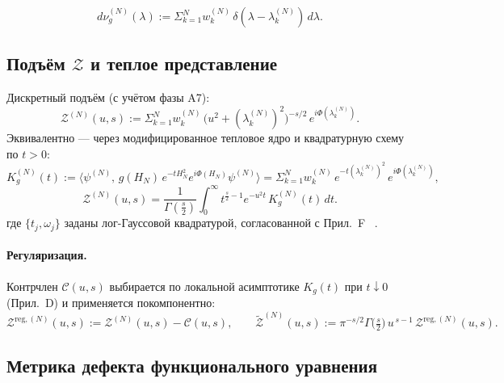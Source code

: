 \documentclass{article}
\numberwithin{equation}{section}
\theoremstyle{plain}
\theoremstyle{definition}
\theoremstyle{remark}
\def\delta{δ}\def\Delta{Δ}\def\epsilon{ε}\def\zeta{ζ}%
\def\omega{ω}\def\Omega{Ω}\def\hbar{ℏ}\def\nabla{∇}%
\def\infty{∞}\def\partial{∂}\def\sum{Σ}\def\int{∫}%
\begin{document}
\begin{equation}\label{eq:H-nuN}
  d\nu_g^{(N)}(\lambda):=\sum_{k=1}^N w_k^{(N)}\,\delta(\lambda-\lambda_k^{(N)})\,d\lambda.
\end{equation}

\subsection*{Подъём \(\mathcal Z\) и теплое представление}

Дискретный подъём (с учётом фазы A7):
\begin{equation}\label{eq:H-ZN}
  \mathcal Z^{(N)}(u,s):=\sum_{k=1}^N w_k^{(N)}\,\big(u^2+(\lambda_k^{(N)})^2\big)^{-s/2}\,e^{i\Phi(\lambda_k^{(N)})}.
\end{equation}
Эквивалентно — через модифицированное тепловое ядро и квадратурную схему по \(t>0\):
\begin{equation}\label{eq:H-heatN}
  K_g^{(N)}(t):=\big\langle \psi^{(N)},\,g(H_N)\,e^{-t H_N^2}e^{i\Phi(H_N)}\psi^{(N)}\big\rangle
  = \sum_{k=1}^N w_k^{(N)}\,e^{-t(\lambda_k^{(N)})^2}\,e^{i\Phi(\lambda_k^{(N)})},
\end{equation}
\begin{equation}\label{eq:H-ZN-heat}
  \mathcal Z^{(N)}(u,s)=\frac{1}{\Gamma(\frac{s}{2})}\int_0^\infty t^{\frac{s}{2}-1}e^{-u^2 t}\,K_g^{(N)}(t)\,dt.
\end{equation}
где \(\{t_j,\omega_j\}\) заданы лог-Гауссовой квадратурой, согласованной с Прил.~F ~\cite{DavisRabinowitz1984}.

\paragraph{Регуляризация.}
Контрчлен \(\mathcal C(u,s)\) выбирается по локальной асимптотике \(K_g(t)\) при \(t\downarrow 0\) (Прил.~D) и применяется покомпонентно:
\begin{equation}\label{eq:H-reg}
  \mathcal Z^{\mathrm{reg},(N)}(u,s):=\mathcal Z^{(N)}(u,s)-\mathcal C(u,s),\qquad
  \widetilde{\mathcal Z}^{(N)}(u,s):=\pi^{-s/2}\Gamma\!\big(\tfrac s2\big)\,u^{\,s-1}\,\mathcal Z^{\mathrm{reg},(N)}(u,s).
\end{equation}

\subsection*{Метрика дефекта функционального уравнения}
\end{document}
